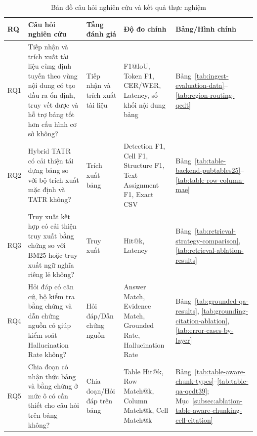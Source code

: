 \documentclass[../DoAn.tex]{subfiles}
\begin{document}
\begin{table}[H]
\centering
\caption{Bản đồ câu hỏi nghiên cứu và kết quả thực nghiệm}
\label{tab:rq-experiment-map}

\footnotesize
\begin{tabularx}{\textwidth}{|
>{\raggedright\arraybackslash}p{}|
>{\raggedright\arraybackslash}X|
>{\raggedright\arraybackslash\hyphenpenalty=10000\exhyphenpenalty=10000}p{}|
>{\raggedright\arraybackslash}p{}|
>{\raggedright\arraybackslash}p{}|
}
\hline
\textbf{RQ} & \textbf{Câu hỏi nghiên cứu} & \textbf{Tầng đánh giá} & \textbf{Độ đo chính} & \textbf{Bảng/Hình chính} \\
\hline
RQ1 & Tiếp nhận và trích xuất tài liệu cùng định tuyến theo vùng nội dung có tạo đầu ra ổn định, truy vết được và hỗ trợ bảng tốt hơn cấu hình cơ sở không? & Tiếp nhận và trích xuất tài liệu & F1@IoU, Token F1, CER/WER, Latency, số khối nội dung bảng & Bảng~\ref{tab:ingest-evaluation-data}--\ref{tab:region-routing-qcdt} \\
\hline
RQ2 & Hybrid TATR có cải thiện tái dựng bảng so với bộ trích xuất mặc định và TATR không? & Trích xuất bảng & Detection F1, Cell F1, Structure F1, Text Assignment F1, Exact CSV & Bảng~\ref{tab:table-backend-pubtables25}--\ref{tab:table-row-column-mae} \\
\hline
RQ3 & Truy xuất kết hợp có cải thiện truy xuất bằng chứng so với BM25 hoặc truy xuất ngữ nghĩa riêng lẻ không? & Truy xuất & Hit@k, Latency & Bảng~\ref{tab:retrieval-strategy-comparison}, \ref{tab:retrieval-ablation-results} \\
\hline
RQ4 & Hỏi đáp có căn cứ, bộ kiểm tra bằng chứng và dẫn chứng nguồn có giúp kiểm soát Hallucination Rate không? & Hỏi đáp/Dẫn chứng nguồn & Answer Match, Evidence Match, Grounded Rate, Hallucination Rate & Bảng~\ref{tab:grounded-qa-results}, \ref{tab:grounding-citation-ablation}, \ref{tab:error-cases-by-layer} \\
\hline
RQ5 & Chia đoạn có nhận thức bảng và bằng chứng ở mức ô có cần thiết cho câu hỏi trên bảng không? & Chia đoạn/Hỏi đáp trên bảng & Table Hit@k, Row Match@k, Column Match@k, Cell Match@k & Bảng~\ref{tab:table-aware-chunk-types}--\ref{tab:table-qa-qcdt39}; Mục~\ref{subsec:ablation-table-aware-chunking-cell-citation} \\
\hline
\end{tabularx}
\end{table}
\end{document}
